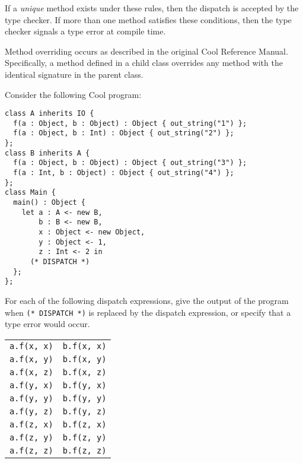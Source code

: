\documentclass[11pt]{article}
\begin{document}
\begin{enumerate}
If a {\em unique} method exists under these rules, then the dispatch
is accepted by the type checker.  If more than one method satisfies
these conditions, then the type checker signals a type error at
compile time.

Method overriding occurs as described in the original Cool Reference
Manual.  Specifically, a method defined in a child class overrides any
method with the identical signature in the parent class.

Consider the following Cool program:
\begin{verbatim}
class A inherits IO {
  f(a : Object, b : Object) : Object { out_string("1") };
  f(a : Object, b : Int) : Object { out_string("2") };
};
class B inherits A {
  f(a : Object, b : Object) : Object { out_string("3") };
  f(a : Int, b : Object) : Object { out_string("4") };
};
class Main {
  main() : Object {
    let a : A <- new B,
        b : B <- new B,
        x : Object <- new Object,
        y : Object <- 1,
        z : Int <- 2 in
      (* DISPATCH *)
  };
};
\end{verbatim}

For each of the following dispatch expressions, give the output of the
program when \texttt{(* DISPATCH *)} is replaced by the dispatch
expression, or specify that a type error would occur.
\begin{center}
\begin{tabular*}{0.5\textwidth}{@{\extracolsep{\fill}}ll}
\texttt{a.f(x, x)} & \texttt{b.f(x, x)} \\
\texttt{a.f(x, y)} & \texttt{b.f(x, y)} \\
\texttt{a.f(x, z)} & \texttt{b.f(x, z)} \\
\texttt{a.f(y, x)} & \texttt{b.f(y, x)} \\
\texttt{a.f(y, y)} & \texttt{b.f(y, y)} \\
\texttt{a.f(y, z)} & \texttt{b.f(y, z)} \\
\texttt{a.f(z, x)} & \texttt{b.f(z, x)} \\
\texttt{a.f(z, y)} & \texttt{b.f(z, y)} \\
\texttt{a.f(z, z)} & \texttt{b.f(z, z)}
\end{tabular*}
\end{center}

\end{enumerate}
\end{document}

